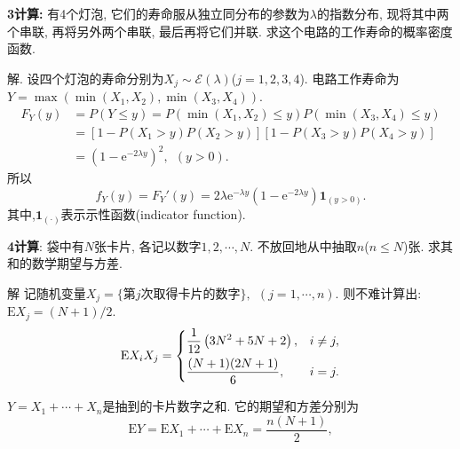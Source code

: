 \documentclass[aspectratio=43]{beamer}
\begin{document}
\begin{frame}{\textbf{3计算:}}
	有4个灯泡, 它们的寿命服从独立同分布的参数为$\lambda$的指数分布, 现将其中两个串联, 再将另外两个串联, 最后再将它们并联. 求这个电路的工作寿命的概率密度函数.
	\begin{block}{解.}
		设四个灯泡的寿命分别为$X_j\sim\mathcal{E}(\lambda)$($j=1,2,3,4$). 电路工作寿命为$Y = \max(\min(X_1,X_2),\min(X_3,X_4))$.
		\begin{equation*}
			\begin{split}
				F_Y(y) &= P(Y\leqslant y) = P(\min(X_1,X_2)\leqslant y)P(\min(X_3,X_4)\leqslant y)\\
				&= \left[ 1-P(X_1>y)P(X_2>y) \right]\left[ 1-P(X_3>y)P(X_4>y) \right]\\
				&=(1-\mathrm{e}^{-2\lambda y})^2,~~(y>0).
			\end{split}
		\end{equation*}
		所以\begin{equation*}
			f_Y(y) =F_Y'(y) =  2\lambda \mathrm{e}^{-\lambda y}(1-\mathrm{e}^{-2\lambda y})\bm{1}_{(y>0)}.
		\end{equation*}
		其中,$\bm{1}_{(\cdot)}$表示示性函数(indicator function).
	\end{block}
\end{frame}

\begin{frame}{\textbf{4计算}:}
	袋中有$N$张卡片, 各记以数字$1,2,\cdots,N$. 不放回地从中抽取$n$($n\leqslant N$)张. 求其和的数学期望与方差.
	\begin{block}{解}
		记随机变量$X_j = \{\text{第}j\text{次取得卡片的数字}\},~~(j=1,\cdots,n)$.
		则不难计算出:$\mathrm{E}X_j = (N+1)/2$.
		\begin{equation*}
			\mathrm{E}X_iX_j =\begin{dcases}
			 \frac{1}{12} \left(3 N^2+5N+2\right),&i\neq j,\\
			 \frac{(N+1)(2N+1)}{6}, &i=j.
			\end{dcases}
		\end{equation*}
		
		$Y = X_1+\cdots+X_n$是抽到的卡片数字之和. 它的期望和方差分别为\begin{equation*}
			\mathrm{E}Y = \mathrm{E}X_1 + \cdots + \mathrm{E}X_n = \frac{n(N+1)}{2},
		\end{equation*}
	\end{block}
\end{frame}
\end{document}
